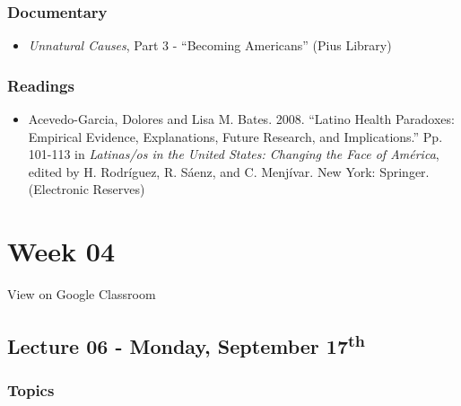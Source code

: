 \documentclass[]{book}
\providecommand{\tightlist}{%
  \setlength{\itemsep}{0pt}\setlength{\parskip}{0pt}}
\theoremstyle{definition}
\theoremstyle{definition}
\theoremstyle{definition}
\theoremstyle{remark}
\begin{document}
\hypertarget{documentary-1}{%
\subsubsection*{Documentary}\label{documentary-1}}

\begin{itemize}
\tightlist
\item
  \emph{Unnatural Causes}, Part 3 - ``Becoming Americans'' (Pius
  Library)
\end{itemize}

\hypertarget{readings-5}{%
\subsubsection*{Readings}\label{readings-5}}

\begin{itemize}
\tightlist
\item
  Acevedo-Garcia, Dolores and Lisa M. Bates. 2008. ``Latino Health
  Paradoxes: Empirical Evidence, Explanations, Future Research, and
  Implications.'' Pp. 101-113 in \emph{Latinas/os in the United States:
  Changing the Face of América}, edited by H. Rodríguez, R. Sáenz, and
  C. Menjívar. New York: Springer. (Electronic Reserves)
\end{itemize}

\hypertarget{week-04}{%
\section*{Week 04}\label{week-04}}

View on Google Classroom

\hypertarget{lecture-06---monday-september-17th}{%
\subsection*{\texorpdfstring{Lecture 06 - Monday, September
17\textsuperscript{th}}{Lecture 06 - Monday, September 17th}}\label{lecture-06---monday-september-17th}}

\hypertarget{topics-6}{%
\subsubsection*{Topics}\label{topics-6}}
\end{document}
